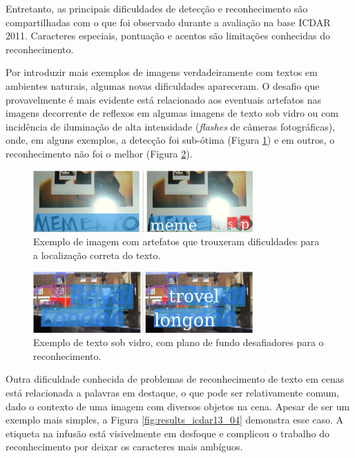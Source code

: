 Entretanto, as principais dificuldades de detecção e reconhecimento são compartilhadas com o que foi observado durante a avaliação na base ICDAR 2011. Caracteres especiais, pontuação e acentos são limitações conhecidas do reconhecimento.

Por introduzir mais exemplos de imagens verdadeiramente com textos em ambientes naturais, algumas novas dificuldades apareceram. O desafio que provavelmente é mais evidente está relacionado aos eventuais artefatos nas imagens decorrente de reflexos em algumas imagens de texto sob vidro ou com incidência de iluminação de alta intensidade (\textit{flashes} de câmeras fotográficas), onde, em alguns exemplos, a detecção foi sub-ótima (Figura \ref{fig:results_icdar13_03}) e em outros, o reconhecimento não foi o melhor (Figura \ref{fig:results_icdar13_02}).

\begin{figure}
    \centering
    \includegraphics[width=0.75\textwidth]{figs/resultados-icdar13-03.png}
    \caption{Exemplo de imagem com artefatos que trouxeram dificuldades para a localização correta do texto.}
    \label{fig:results_icdar13_03}
\end{figure}

\begin{figure}
    \centering
    \includegraphics[width=0.75\textwidth]{figs/resultados-icdar13-02.png}
    \caption{Exemplo de texto sob vidro, com plano de fundo desafiadores para o reconhecimento.}
    \label{fig:results_icdar13_02}
\end{figure}

Outra dificuldade conhecida de problemas de reconhecimento de texto em cenas está relacionada a palavras em destaque, o que pode ser relativamente comum, dado o contexto de uma imagem com diversos objetos na cena. Apesar de ser um exemplo mais simples, a Figura \ref{fig:results_icdar13_04} demonstra esse caso. A etiqueta na infusão está visivelmente em desfoque e complicou o trabalho do reconhecimento por deixar os caracteres mais ambíguos.

